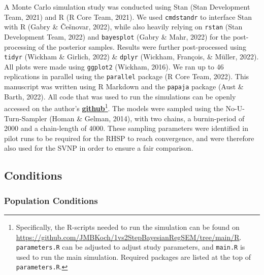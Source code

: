 \documentclass[
  man, donotrepeattitle,floatsintext]{apa6}
\begin{document}
A Monte Carlo simulation study was conducted using Stan
(Stan Development Team, 2021) and R (R Core Team, 2021). We used
\texttt{cmdstandr} to interface Stan with R (Gabry \& Češnovar, 2022), while also
heavily relying on \texttt{rstan} (Stan Development Team, 2022) and
\texttt{bayesplot} (Gabry \& Mahr, 2022) for the post-processing of the
posterior samples. Results were further post-processed using \texttt{tidyr}
(Wickham \& Girlich, 2022) \& \texttt{dplyr} (Wickham, François, \& Müller, 2022). All plots were
made using \texttt{ggplot2} (Wickham, 2016). We ran up to 46
replications in parallel using the \texttt{parallel} package
(R Core Team, 2022). This manuscript was written using R
Markdown and the \texttt{papaja} package (Aust \& Barth, 2022). All code that was
used to run the simulations can be openly accessed on the author's
\href{https://github.com/JMBKoch/1vs2StepBayesianRegSEM}{\textbf{github}}\footnote{Specifically, the R-scripts needed to run the simulation can be
  found on
  \url{https://github.com/JMBKoch/1vs2StepBayesianRegSEM/tree/main/R}.
  \texttt{parameters.R} can be adjusted to adjust study parameters, and
  \texttt{main.R} is used to run the main simulation. Required packages are
  listed at the top of \texttt{parameters.R}.}. The
models were sampled using the No-U-Turn-Sampler (Homan \& Gelman, 2014),
with two chains, a burnin-period of 2000 and a chain-length of 4000.
These sampling parameters were identified in pilot runs to be required
for the RHSP to reach convergence, and were therefore also used for the
SVNP in order to ensure a fair comparison.

\hypertarget{conditions}{%
\subsection{Conditions}\label{conditions}}

\hypertarget{population-conditions}{%
\subsubsection{Population Conditions}\label{population-conditions}}
\end{document}
